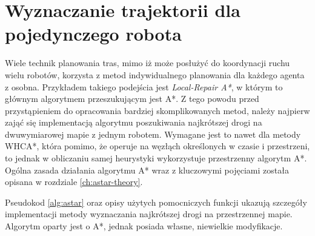 \section{Wyznaczanie trajektorii dla pojedynczego robota}
\label{ch:alg-single-astar}

Wiele technik planowania tras, mimo iż może posłużyć do koordynacji ruchu wielu robotów, korzysta z metod indywidualnego planowania dla każdego agenta z osobna. Przykładem takiego podejścia jest {\it Local-Repair A*}, w którym to głównym algorytmem przeszukującym jest A*.
Z tego powodu przed przystąpieniem do opracowania bardziej skomplikowanych metod, należy najpierw zająć się implementacją algorytmu poszukiwania najkrótszej drogi na dwuwymiarowej mapie z jednym robotem. Wymagane jest to nawet dla metody WHCA*, która pomimo, że operuje na węzłąch określonych w czasie i przestrzeni, to jednak w obliczaniu samej heurystyki wykorzystuje przestrzenny algorytm A*.
Ogólna zasada działania algorytmu A* wraz z kluczowymi pojęciami została opisana w rozdziale \ref{ch:astar-theory}.

Pseudokod \ref{alg:astar} oraz opisy użytych pomocniczych funkcji ukazują szczegóły implementacji metody wyznaczania najkrótszej drogi na przestrzennej mapie. Algorytm oparty jest o A*, jednak posiada własne, niewielkie modyfikacje.

